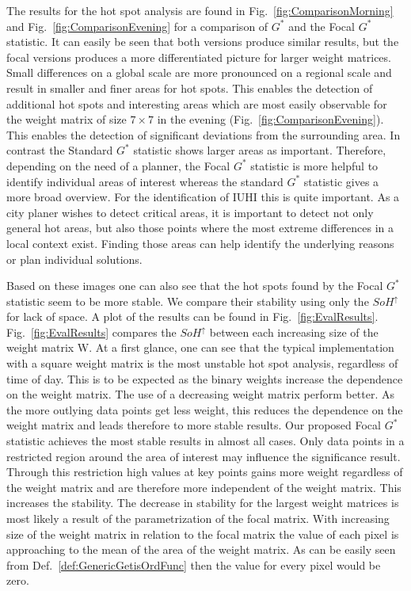 \documentclass{itatnew}
\begin{document}
The results for the hot spot analysis are found in
Fig.~\ref{fig:ComparisonMorning} and Fig.~\ref{fig:ComparisonEvening} for a
comparison of $G^*$ and the Focal $G^*$ statistic. It can easily be seen that
both versions produce similar results, but the focal versions produces a more
differentiated picture for larger weight matrices. Small differences on a
global scale are more pronounced on a regional scale and result in smaller and
finer areas for hot spots. This enables the detection of additional hot spots
and interesting areas which are most easily observable for the weight matrix of
size $7{\times}7$ in the evening (Fig.~\ref{fig:ComparisonEvening}). This
enables the detection of significant deviations from the surrounding area. 
In contrast the Standard $G^*$ statistic shows larger areas as important.
Therefore, depending on the need of a planner, the Focal $G^*$ statistic
is more helpful to identify individual areas of interest whereas the standard
$G^*$ statistic gives a more broad overview. For the identification of IUHI this
is quite important. As a city planer wishes to detect critical areas, it is
important to detect not only general hot areas, but also those points where the
most extreme differences in a local context exist. Finding those areas can help 
identify the underlying reasons or plan individual solutions.

Based on these images one can also see that the hot spots found by the Focal
$G^*$ statistic seem to be more stable. We compare their stability using only
the $ SoH^\uparrow$ for lack of space. A plot of the results can be found in
Fig.~\ref{fig:EvalResults}. Fig.~\ref{fig:EvalResults} compares the $
SoH^\uparrow$ between each increasing size of the weight matrix W. At a first
glance, one can see that the typical implementation with a square weight matrix
is the most unstable hot spot analysis, regardless of time of day. This is to be
expected as the binary weights increase the dependence on the weight matrix. The
use of a decreasing weight matrix perform better. As the more outlying data
points get less weight, this reduces the dependence on the weight matrix and
leads therefore to more stable results. Our proposed Focal $G^*$ statistic
achieves the most stable results in almost all cases. Only data points in a
restricted region around the area of interest may influence the significance
result. Through this restriction high values at key points gains more weight
regardless of the weight matrix and are therefore more independent of the weight
matrix. This increases the stability. The decrease in stability for the largest
weight matrices is most likely a result of the parametrization of the focal
matrix. With increasing size of the weight matrix in relation to the focal
matrix the value of each pixel is approaching to the mean of the area of the
weight matrix. As can be easily seen from Def.~\ref{def:GenericGetisOrdFunc}
then the value for every pixel would be zero.
\end{document}
